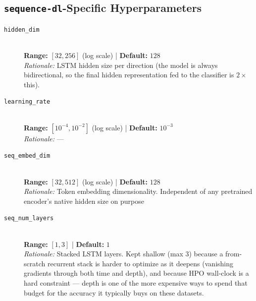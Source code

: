\documentclass[10pt]{article}
\begin{document}
\subsection*{\texttt{sequence-dl}-Specific Hyperparameters}

\begin{description}
    \item[\texttt{hidden\_dim}] \hfill \\
    \textbf{Range:} $[32, 256]$ (log scale) \quad | \quad \textbf{Default:} $128$ \\
    \textit{Rationale:} LSTM hidden size per direction (the model is always bidirectional, so the final hidden representation fed to the classifier is $2\times$ this).

    \item[\texttt{learning\_rate}] \hfill \\
    \textbf{Range:} $[10^{-4}, 10^{-2}]$ (log scale) \quad | \quad \textbf{Default:} $10^{-3}$ \\
    \textit{Rationale:} ---



    \item[\texttt{seq\_embed\_dim}] \hfill \\
    \textbf{Range:} $[32, 512]$ (log scale) \quad | \quad \textbf{Default:} $128$ \\
    \textit{Rationale:} Token embedding dimensionality. Independent of any pretrained encoder's native hidden size on purpose

    \item[\texttt{seq\_num\_layers}] \hfill \\
    \textbf{Range:} $[1, 3]$ \quad | \quad \textbf{Default:} $1$ \\
    \textit{Rationale:} Stacked LSTM layers. Kept shallow (max 3) because a from-scratch recurrent stack is harder to optimize as it deepens (vanishing gradients through both time and depth), and because HPO wall-clock is a hard constraint --- depth is one of the more expensive ways to spend that budget for the accuracy it typically buys on these datasets.


\end{description}
\end{document}
